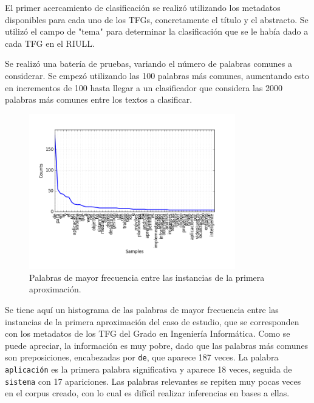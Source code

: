 \lhead{\emph{\ChapterThree{}}}
\label{classification-conclusions}
El primer acercamiento de clasificación se realizó utilizando los metadatos disponibles para cada uno de los TFGs, concretamente el título y el abstracto. Se utilizó el campo de "tema" para determinar la clasificación que se le había dado a cada TFG en el RIULL.
%

Se realizó una batería de pruebas, variando el número de palabras comunes a considerar. Se empezó utilizando las 100 palabras más comunes, aumentando esto en incrementos de 100 hasta llegar a un clasificador que considera las 2000 palabras más comunes entre los textos a clasificar.

\begin{center}
\begin{figure}[!ht]
  \label{fig:metadata_view}
  \centering
    \includegraphics[width=0.8\textwidth]{Images/clas1-words}
  \caption{Palabras de mayor frecuencia entre las instancias de la primera aproximación.}
\end{figure}
\end{center}

Se tiene aquí un histograma de las palabras de mayor frecuencia entre las instancias de la primera aproximación del caso de estudio, que se corresponden con los metadatos de los TFG del Grado en Ingeniería Informática.
%
Como se puede apreciar, la información es muy pobre, dado que las palabras más comunes son preposiciones, encabezadas por \texttt{de}, que aparece 187 veces. La palabra \texttt{aplicación} es la primera palabra significativa y aparece 18 veces, seguida de \texttt{sistema} con 17 apariciones.
%
Las palabras relevantes se repiten muy pocas veces en el corpus creado, con lo cual es difícil realizar inferencias en bases a ellas.

